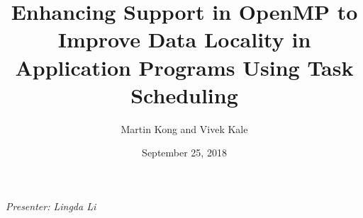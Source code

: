 \documentclass{beamer}
\title[Locality for OpenMP Tasking]{Enhancing Support in OpenMP to Improve Data Locality in Application Programs Using Task Scheduling}
\author[Presenter: Lingda Li]{Martin Kong and Vivek Kale}
\date{September 25, 2018}
\begin{document}
\begin{frame}
\maketitle
\begin{center}
    \textit{Presenter: Lingda Li}
\end{center}
\newline

\end{frame}
\end{document}
